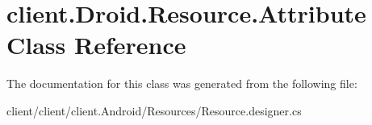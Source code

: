 \hypertarget{classclient_1_1Droid_1_1Resource_1_1Attribute}{\section{client.\-Droid.\-Resource.\-Attribute Class Reference}
\label{classclient_1_1Droid_1_1Resource_1_1Attribute}
}


The documentation for this class was generated from the following file\-:\begin{DoxyCompactItemize}
\item 
client/client/client.\-Android/\-Resources/Resource.\-designer.\-cs\end{DoxyCompactItemize}
